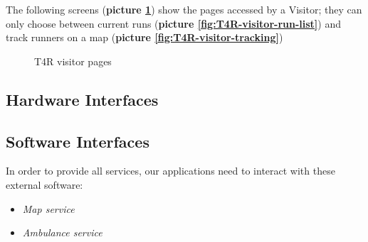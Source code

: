 The following screens (\textbf{picture \ref{fig:T4R-visitor-pages}}) show the pages accessed by a Visitor; they can only choose between current runs (\textbf{picture \ref{fig:T4R-visitor-run-list}}) and track runners on a map (\textbf{picture \ref{fig:T4R-visitor-tracking}})

\begin{figure}[H]
  \centering
  \caption{T4R visitor pages}
  \label{fig:T4R-visitor-pages}
\end{figure}

\subsection{Hardware Interfaces}
%


\subsection{Software Interfaces}
%
 In order to provide all services, our applications need to interact with these external software:
\begin{itemize}
    \item \emph{Map service}
    \item \emph{Ambulance service}
\end{itemize}

